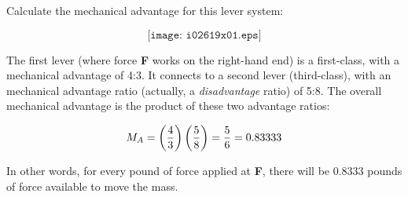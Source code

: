

Calculate the mechanical advantage for this lever system:

$$\texttt{[image: i02619x01.eps]}$$







The first lever (where force {\bf F} works on the right-hand end) is a first-class, with a mechanical advantage of 4:3.  It connects to a second lever (third-class), with an mechanical advantage ratio (actually, a {\it disadvantage} ratio) of 5:8.  The overall mechanical advantage is the product of these two advantage ratios:

$$M_A = \left( 4 \over 3 \right) \left(5 \over 8 \right) = {5 \over 6} = 0.83333$$

In other words, for every pound of force applied at {\bf F}, there will be 0.8333 pounds of force available to move the mass.











